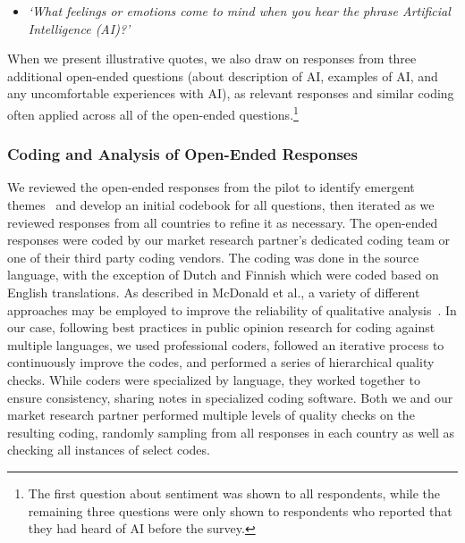 \documentclass[11pt]{article} %
\begin{document}
\begin{itemize}
\item[] \textit{`What feelings or emotions come to mind when you hear the phrase Artificial Intelligence (AI)?'}
\end{itemize}

When we present illustrative quotes, we also draw on responses from three additional open-ended questions (about description of AI, examples of AI, and any uncomfortable experiences with AI), as relevant responses and similar coding often applied across all of the open-ended questions.\footnote{The first question about sentiment was shown to all respondents, while the remaining three questions were only shown to respondents who reported that they had heard of AI before the survey.}

\subsubsection{Coding and Analysis of Open-Ended Responses}\label{Coding_Section}
We reviewed the open-ended responses from the pilot to identify emergent themes~\cite{beyer1997contextual} and develop an initial codebook for all questions, then iterated as we reviewed responses from all countries to refine it as necessary.
The open-ended responses were coded by our market research partner's dedicated coding team or one of their third party coding vendors. The coding was done in the source language, with the exception of Dutch and Finnish which were coded based on English translations.
As described in McDonald et al., a variety of different approaches may be employed to improve the reliability of qualitative analysis~\cite{mcdonald2019}.
In our case, following best practices in public opinion research for coding against multiple languages, we used professional coders, followed an iterative process to continuously improve the codes, and performed a series of hierarchical quality checks.
While coders were specialized by language, they worked together to ensure consistency, sharing notes in specialized coding software. Both we and our market research partner performed multiple levels of quality checks on the resulting coding, randomly sampling from all responses in each country as well as checking all instances of select codes. 
\end{document}
